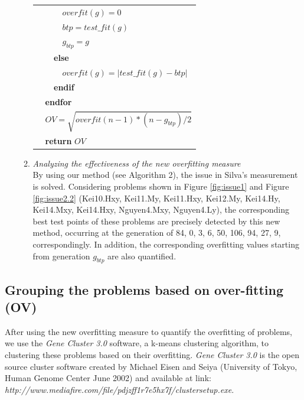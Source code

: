 \begin{enumerate}
\begin{enumerate}
\begin{table}
\begin{tabular}{lllllllllll}
\multicolumn{1}{l|}{} & \multicolumn{1}{l|}{} & \multicolumn{1}{l|}{} & \multicolumn{8}{l}{$overfit(g)= 0$} \\
\multicolumn{1}{l|}{} & \multicolumn{1}{l|}{} & \multicolumn{1}{l|}{} & \multicolumn{8}{l}{$btp = test\_fit(g)$} \\
\multicolumn{1}{l|}{} & \multicolumn{1}{l|}{} & \multicolumn{1}{l|}{} & \multicolumn{8}{l}{${g}_{btp}= g$} \\
\multicolumn{1}{l|}{} & \multicolumn{1}{l|}{} & \multicolumn{9}{l}{\textbf{else}} \\
\multicolumn{1}{l|}{} & \multicolumn{1}{l|}{} & \multicolumn{1}{l|}{} & \multicolumn{8}{l}{ $overfit(g) = |test\_fit(g) - btp| $} \\
\multicolumn{1}{l|}{} & \multicolumn{1}{l|}{} & \multicolumn{9}{l}{\textbf{endif}} \\
\multicolumn{1}{l|}{} & \multicolumn{10}{l}{\textbf{endfor}} \\
\multicolumn{1}{l|}{} & \multicolumn{10}{l}{$OV=\sqrt{overfit(n-1)*(n-{g}_{btp})/2}$ } \\
\multicolumn{1}{l|}{} & \multicolumn{10}{l}{\textbf{return} $OV$ } \\
\end{tabular}
\end{table}

\item \textit{Analyzing the effectiveness of the new overfitting measure}\\
By using our method (see Algorithm 2), the issue in Silva's measurement is solved. Considering problems shown in Figure \ref{fig:issue1} and Figure \ref{fig:issue2.2} (Kei10.Hxy, Kei11.My, Kei11.Hxy, Kei12.My, Kei14.Hy, Kei14.Mxy, Kei14.Hxy, Nguyen4.Mxy, Nguyen4.Ly), the corresponding best test points of these problems are precisely detected by this new method, occurring at the generation of 84, 0, 3, 6, 50, 106, 94, 27, 9, correspondingly. In addition, the corresponding overfitting values starting from generation ${g}_{btp}$ are also quantified.
\end{enumerate}
\end{enumerate}

\subsection {Grouping the problems based on over-fitting (OV)}
\label{clus}
After using the new overfitting measure to quantify the overfitting of problems, we use the \textit{Gene Cluster 3.0} software, a k-means clustering algorithm, to clustering these problems based on their overfitting. \textit{Gene Cluster 3.0} is the open source cluster software created by Michael Eisen and Seiya (University of Tokyo, Human Genome Center June 2002) and available at link:\\
\textit{http://www.mediafire.com/file/pdjzff1r7e5hx7f/clustersetup.exe}.

